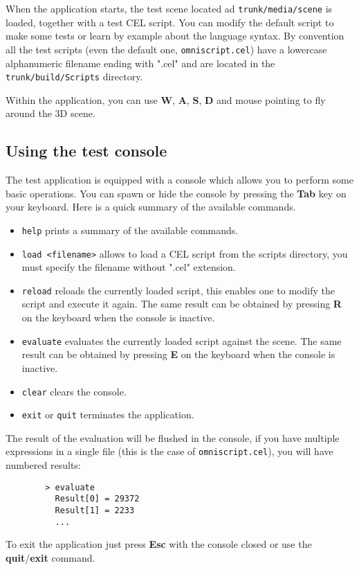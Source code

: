     		When the application starts, the test scene located ad \texttt{trunk/media/scene} is loaded, together with a test CEL script. You can modify the default script
    		to make some tests or learn by example about the language syntax. By convention all the test scripts (even the default one, \texttt{omniscript.cel}) have a lowercase
    		alphanumeric filename ending with ".cel" and are located in the \texttt{trunk/build/Scripts} directory.

    		Within the application, you can use \textbf{W}, \textbf{A}, \textbf{S}, \textbf{D} and mouse pointing to fly around the 3D scene.

    	\subsection{Using the test console}

    		The test application is equipped with a console which allows you to perform some basic operations. You can spawn or hide the console by pressing the \textbf{Tab} key on your keyboard. Here is a quick summary of the available commands.

    		\begin{itemize}
    			\setlength{\itemsep}{2pt}
    			\setlength{\parskip}{0pt}
    			\setlength{\parsep}{0pt}

    			\item   \texttt{help} prints a summary of the available commands.
    			\item 	\texttt{load <filename>} allows to load a CEL script from the scripts directory, you must specify the filename without ".cel" extension.
    			\item 	\texttt{reload} reloads the currently loaded script, this enables one to modify the script and execute it again. The same result can be obtained by 
    					pressing \textbf{R} on the keyboard when the console is inactive.
    			\item   \texttt{evaluate} evaluates the currently loaded script against the scene. The same result can be obtained by pressing \textbf{E} on the keyboard when
    					the console is inactive.
    			\item   \texttt{clear} clears the console.
    			\item   \texttt{exit} or \texttt{quit} terminates the application.
    		\end{itemize}

    	    \noindent
    		The result of the evaluation will be flushed in the console, if you have multiple expressions in a single file (this is the case of \texttt{omniscript.cel}), you will have numbered results:

    		\begin{verbatim}
        > evaluate
          Result[0] = 29372
          Result[1] = 2233
          ...
    		\end{verbatim}

    		\noindent
    		To exit the application just press \textbf{Esc} with the console closed or use the \textbf{quit}/\textbf{exit} command.
    